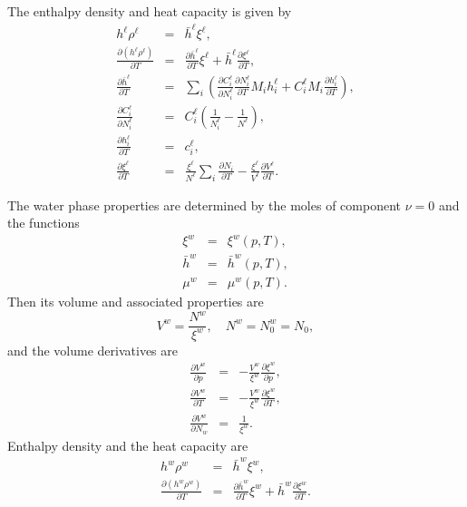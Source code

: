 The enthalpy density and heat capacity is given by
\begin{eqnarray}
  h^\ell \rho^\ell & = & \bar h^\ell \xi^\ell, \\
  \frac{\partial\left(h^\ell\rho^\ell\right)}{\partial T} & = &
  \frac{\partial\bar h^\ell}{\partial T} \xi^\ell +
  \bar h^\ell \frac{\partial\xi^\ell}{\partial T}, \\
  \frac{\partial\bar h^\ell}{\partial T} & = &
  \sum_i \left(
    \frac{\partial C_i^\ell}{\partial N_i^\ell}
    \frac{\partial N_i^\ell}{\partial T} M_i h_i^\ell +
    C_i^\ell M_i \frac{\partial h_i^\ell}{\partial T}
  \right), \\
  \frac{\partial C_i^\ell}{\partial N_i^\ell} & = &
  C_i^\ell \left(
    \frac{1}{N_i^\ell} - \frac{1}{N^\ell}
  \right), \\
  \frac{\partial h_i^\ell}{\partial T} & = & c_i^\ell, \\
  \frac{\partial\xi^\ell}{\partial T} & = &
  \frac{\xi^\ell}{N^\ell} \sum_i \frac{\partial N_i}{\partial T} -
  \frac{\xi^\ell}{V^\ell} \frac{\partial V^\ell}{\partial T}.
\end{eqnarray}



The water phase properties are determined by the moles of component
$\nu=0$ and the functions
\begin{eqnarray}
  \xi^w & = & \xi^w\left(p,T\right), \\
  \bar h^w & = & \bar h^w\left(p,T\right), \\
  \mu^w & = & \mu^w\left(p,T\right).
\end{eqnarray}
Then its volume and associated properties are
\begin{equation}
  V^w = \frac{N^w}{\xi^w},\quad
  N^w = N_0^w = N_0,
\end{equation}
and the volume derivatives are
\begin{eqnarray}
  \frac{\partial V^w}{\partial p} & = &
  -\frac{V^w}{\xi^w} \frac{\partial\xi^w}{\partial p}, \\
  \frac{\partial V^w}{\partial T} & = &
  -\frac{V^w}{\xi^w} \frac{\partial\xi^w}{\partial T}, \\
  \frac{\partial V^w}{\partial N_w} & = &
  \frac{1}{\xi^w}.
\end{eqnarray}
Enthalpy density and the heat capacity are
\begin{eqnarray}
  h^w \rho^w & = & \bar h^w \xi^w, \\
  \frac{\partial\left(h^w \rho^w\right)}{\partial T} & = &
  \frac{\partial \bar h^w}{\partial T} \xi^w +
  \bar h^w \frac{\partial \xi^w}{\partial T}.
\end{eqnarray}

